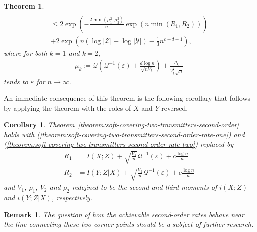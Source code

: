 \documentclass[journal]{IEEEtran}
\newcommand{\codebookRateOne}{R_1}
\newcommand{\codebookRateTwo}{R_2}
\newcommand{\channelInOne}{X}
\newcommand{\channelInTwo}{Y}
\newcommand{\channelInTwoAlph}{\mathcal{Y}}
\newcommand{\channelOut}{Z}
\newcommand{\channelOutAlph}{\mathcal{Z}}
\newcommand{\codebookBlocklength}{n}
\newcommand{\txIndex}{k}
\newcommand{\mutualInformation}[2]{I(#1;#2)}
\newcommand{\mutualInformationConditional}[3]{I(#1;#2|#3)}
\newcommand{\informationDensity}[2]{i({#1};{#2})}
\newcommand{\informationDensityConditional}[3]{i({#1};{#2} | {#3})}
\newcommand{\cardinality}[1]{\lvert #1 \rvert}
\newcommand{\typicalityParam}{\varepsilon}
\newcommand{\channelDispersion}[1]{V_{#1}}
\newcommand{\channelThirdMoment}[1]{\rho_{#1}}
\newcommand{\normalcdfComplement}{\mathcal{Q}}
\newcommand{\normalcdfComplementInverse}{\mathcal{Q}^{-1}}
\newcommand{\secondOrderParamC}{c}
\newcommand{\secondOrderParamD}{d}
\newcommand{\secondOrderAtypicalProbability}[1]{\mu_{#1}}
\newtheorem{theorem}{Theorem}
\newtheorem{cor}{Corollary}
\newtheorem{remark}{Remark}
\begin{document}
\begin{theorem}
\begin{multline*}
\\
\leq
2\exp\left(
  -\frac{2\min(\secondOrderAtypicalProbability{1}^2,\secondOrderAtypicalProbability{2}^2)}
        {\codebookBlocklength}
  \exp(\codebookBlocklength \min(\codebookRateOne,\codebookRateTwo))
\right) \\
+
2\exp\left(
  \codebookBlocklength(\log \cardinality{\channelOutAlph} + \log \cardinality{\channelInTwoAlph})
  -\frac{1}{3}
  \codebookBlocklength^{\secondOrderParamC - \secondOrderParamD - 1}
\right),
\end{multline*}
where for both $\txIndex=1$ and $\txIndex=2$,
\begin{align*}
\secondOrderAtypicalProbability{\txIndex}
:=
\normalcdfComplement\left(
  \normalcdfComplementInverse(\typicalityParam)
  +
  \frac{\secondOrderParamD \log \codebookBlocklength}
       {\sqrt{\codebookBlocklength\channelDispersion{\txIndex}}}
\right)
+
\frac{\channelThirdMoment{\txIndex}}
     {\channelDispersion{\txIndex}^{\frac{3}{2}} \sqrt{\codebookBlocklength}}
\end{align*}
tends to $\typicalityParam$ for $\codebookBlocklength \rightarrow \infty$.
\end{theorem}
An immediate consequence of this theorem is the following corollary that follows by applying the theorem with the roles of $\channelInOne$ and $\channelInTwo$ reversed.
\begin{cor}
\label{cor:soft-covering-two-transmitters-second-order}
Theorem~\ref{theorem:soft-covering-two-transmitters-second-order} holds with (\ref{theorem:soft-covering-two-transmitters-second-order-rate-one}) and (\ref{theorem:soft-covering-two-transmitters-second-order-rate-two}) replaced by
\begin{align*}
\codebookRateOne
&=
\mutualInformation{\channelInOne}{\channelOut}
+
\sqrt{\frac{\channelDispersion{1}}{\codebookBlocklength}} \normalcdfComplementInverse(\typicalityParam)
+
\secondOrderParamC\frac{\log \codebookBlocklength}
                       {\codebookBlocklength} \\
\codebookRateTwo
&=
\mutualInformationConditional{\channelInTwo}{\channelOut}{\channelInOne}
+
\sqrt{\frac{\channelDispersion{2}}{\codebookBlocklength}} \normalcdfComplementInverse(\typicalityParam)
+
\secondOrderParamC\frac{\log \codebookBlocklength}
                       {\codebookBlocklength}
\end{align*}
and $\channelDispersion{1}$, $\channelThirdMoment{1}$, $\channelDispersion{2}$ and $\channelThirdMoment{2}$ redefined to be the second and third moments of $\informationDensity{\channelInOne}{\channelOut}$ and $\informationDensityConditional{\channelInTwo}{\channelOut}{\channelInOne}$, respectively.
\end{cor}
\begin{remark}
The question of how the achievable second-order rates behave near the line connecting these two corner points should be a subject of further research.
\end{remark}
\end{document}
